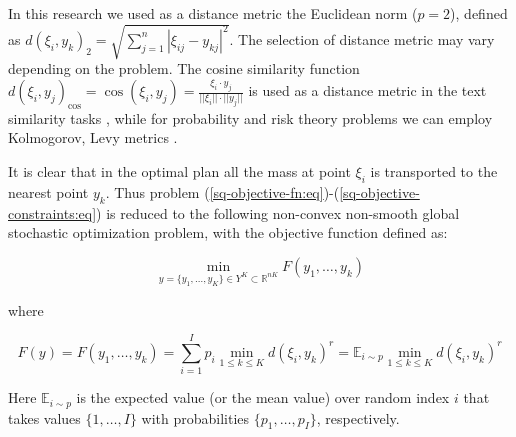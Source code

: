 In this research we used as a distance metric the Euclidean norm ($ p = 2 $), defined as $ d(\xi_i, y_k)_2 = \sqrt{\sum_{j=1}^n | \xi_{ij} - y_{kj} |^2} $. The selection of distance metric may vary depending on the problem. The cosine similarity function $ d(\xi_i, y_j)_{\text{cos}} = \cos(\xi_i, y_j) = \frac{\xi_i \cdot y_j}{|| \xi_i || \cdot || y_j ||} $ is used as a distance metric in the text similarity tasks \cite{Babic_2020,vor_der_bruck_pouly_2019}, while for probability and risk theory problems we can employ Kolmogorov, Levy metrics \cite{Kuzmenko_Uryasev_2019}.

It is clear that in the optimal plan all the mass at point $ \xi_i $ is transported to the nearest point $ y_k $. Thus problem (\ref{sq-objective-fn:eq})-(\ref{sq-objective-constraints:eq}) is reduced to the following non-convex non-smooth global stochastic optimization problem, with the objective function defined as:

\begin{equation}
    \label{global-sq-objective-fn:eq}
        \min_{y = \{ y_1, \ldots, y_K \} \in Y^K \subset \mathbb{R}^{nK}} F(y_1, \ldots, y_k)
\end{equation}

\noindent where

\begin{equation}
    \label{global-sq-fn-expansion:eq}
        F(y) = F(y_1, \ldots, y_k) = \sum_{i=1}^I p_i \min_{1 \leq k \leq K} d(\xi_i, y_k)^r = \mathbb{E}_{i \sim p} \min_{1 \leq k \leq K} d(\xi_i, y_k)^r
\end{equation}

Here $ \mathbb{E}_{i \sim p} $ is the expected value (or the mean value) over random index $ i $ that takes values $ \{ 1, \ldots, I \} $ with probabilities $ \{ p_1, \ldots, p_I \} $, respectively.

